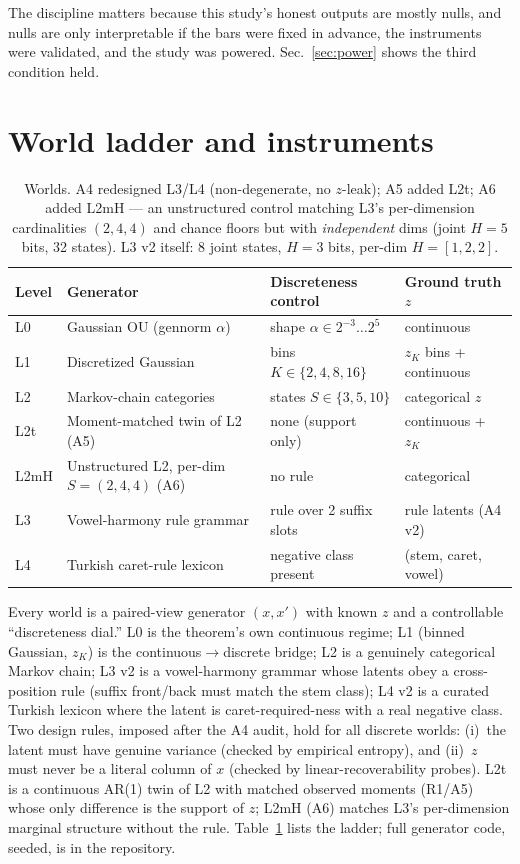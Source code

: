 \documentclass[10pt]{article}
\begin{document}
The discipline matters because this study's honest outputs are mostly nulls,
and nulls are only interpretable if the bars were fixed in advance, the
instruments were validated, and the study was powered. Sec.~\ref{sec:power}
shows the third condition held.

\section{World ladder and instruments}
\label{sec:worlds}
\begin{table}[ht]\centering\small
\begin{tabular}{@{}llll@{}}
\toprule
Level & Generator & Discreteness control & Ground truth $z$ \\
\midrule
L0 & Gaussian OU (gennorm $\alpha$) & shape $\alpha \in 2^{-3}\dots 2^5$ &
continuous \\
L1 & Discretized Gaussian & bins $K \in \{2,4,8,16\}$ & $z_K$ bins + continuous \\
L2 & Markov-chain categories & states $S \in \{3,5,10\}$ & categorical $z$ \\
L2t & Moment-matched twin of L2 (A5) & none (support only) & continuous + $z_K$ \\
L2mH & Unstructured L2, per-dim $S{=}(2,4,4)$ (A6) & no rule & categorical \\
L3 & Vowel-harmony rule grammar & rule over 2 suffix slots & rule latents (A4 v2) \\
L4 & Turkish caret-rule lexicon & negative class present & (stem, caret, vowel) \\
\bottomrule
\end{tabular}
\caption{Worlds. A4 redesigned L3/L4 (non-degenerate, no $z$-leak); A5 added
L2t; A6 added L2mH --- an unstructured control matching L3's per-dimension
cardinalities $(2,4,4)$ and chance floors but with \emph{independent} dims
(joint $H{=}5$ bits, 32 states). L3 v2 itself: 8 joint states, $H{=}3$ bits,
per-dim $H{=}[1,2,2]$.}
\label{tab:worlds}
\end{table}

Every world is a paired-view generator $(x,x')$ with known $z$ and a
controllable ``discreteness dial.'' L0 is the theorem's own continuous regime;
L1 (binned Gaussian, $z_K$) is the continuous$\to$discrete bridge; L2 is a
genuinely categorical Markov chain; L3 v2 is a vowel-harmony grammar whose
latents obey a cross-position rule (suffix front/back must match the stem
class); L4 v2 is a curated Turkish lexicon where the latent is
caret-required-ness with a real negative class. Two design rules, imposed after
the A4 audit, hold for all discrete worlds: (i)~the latent must have genuine
variance (checked by empirical entropy), and (ii)~$z$ must never be a literal
column of $x$ (checked by linear-recoverability probes). L2t is a continuous
AR(1) twin of L2 with matched observed moments (R1/A5) whose only difference is
the support of $z$; L2mH (A6) matches L3's per-dimension marginal structure
without the rule. Table~\ref{tab:worlds} lists the ladder; full generator
code, seeded, is in the repository.
\end{document}
